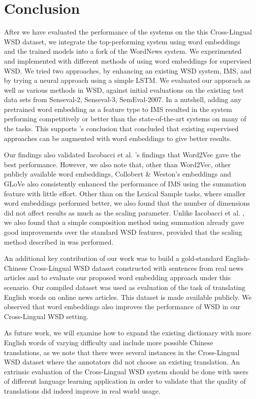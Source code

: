 \section{Conclusion}
\label{section:conclusion}

After we have evaluated the performance of the systems on the this
Cross-Lingual WSD dataset, we integrate the top-performing system
using word embeddings and the trained models into a fork of the
WordNews system. We experimented and implemented with different
methods of using word embeddings for supervised WSD. We tried two
approaches, by enhancing an existing WSD system, IMS, and by trying a
neural approach using a simple LSTM.  We evaluated our apporach as
well as various methods in WSD, against initial evaluations on the
existing test data sets from Senseval-2, Senseval-3, SemEval-2007. In
a nutshell, adding any pretrained word embedding as a feature type to
IMS resulted in the system performing competitively or better than the
state-of-the-art systems on many of the tasks. This supports
\cite{Iacobacci2016}'s conclusion that concluded that existing
supervised approaches can be augmented with word embeddings to give
better results.

Our findings also validated Iacobacci et al. 's
findings that Word2Vec gave the best performance. However, we also
note that, other than Word2Vec, other publicly available word
embeddings, Collobert \& Weston's embeddings and GLoVe also
consistently enhanced the performance of IMS using the summation
feature with little effort. Other than on the Lexical Sample tasks,
where smaller word embeddings performed better, we also found that the
number of dimensions did not affect results as much as the scaling
parameter. Unlike Iacobacci et al. , we also
found that a simple composition method using summation already gave
good improvements over the standard WSD features, provided that the
scaling method described in \cite{Taghipour15} was performed.

An additional key contribution of our work was to build a
gold-standard English-Chinese Cross-Lingual WSD dataset constructed
with sentences from real news articles and to evaluate our proposed
word embedding approach under this scenario.  Our compiled dataset was
used as evaluation of the task of translating English words on online
news articles. This dataset is made available publicly.  We observed
that word embeddings also improves the performance of WSD in our
Cross-Lingual WSD setting.

As future work, we will examine how to expand the existing dictionary
with more English words of varying difficulty and include more
possible Chinese translations, as we note that there were several
instances in the Cross-Lingual WSD dataset where the annotators did
not choose an existing translation. An extrinsic evaluation of the
Cross-Lingual WSD system should be done with users of different
language learning application in order to validate that the quality of
translations did indeed improve in real world usage.
